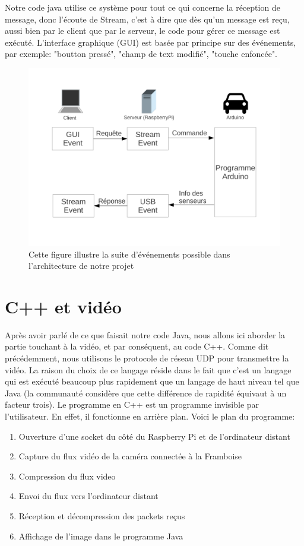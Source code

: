 \documentclass[a4paper,11pt]{report}
\begin{document}
{Notre code java utilise ce système pour tout ce qui concerne la réception de message, donc l'écoute de Stream, c'est à dire que dès qu'un message est reçu, aussi bien par le client que par le serveur, le code pour gérer ce message est exécuté. L'interface graphique (GUI) est basée par principe sur des événements, par exemple: "boutton pressé", "champ de text modifié", "touche enfoncée".

\begin{figure}[h]
\includegraphics[width=1.0\textwidth]{figures/EventProgramming2.pdf}
\caption[Evénements dans notr architecture]{\label{SuiteEvent}Cette figure illustre la suite d'événements possible dans l'architecture de notre projet}
\end{figure}
\section{C++ et vidéo}

Après avoir parlé de ce que faisait notre code Java, nous allons ici aborder la partie touchant à la vidéo, et par conséquent, au code C++.  Comme dit précédemment, nous utilisons le protocole de réseau UDP  pour transmettre la vidéo. La raison du choix de ce langage réside dans le fait que c'est un langage qui est exécuté beaucoup plus rapidement que un langage de haut niveau tel que Java (la communauté considère que cette différence de rapidité équivaut à un facteur trois). Le programme en C++ est un programme invisible par l'utilisateur. En effet, il fonctionne en arrière plan. Voici le plan du programme:
\begin{enumerate}
\item Ouverture d'une socket du côté du Raspberry Pi et de l'ordinateur distant
\item Capture du flux vidéo de la caméra connectée à la Framboise
\item Compression du flux video
\item Envoi du flux vers l'ordinateur distant
\item Réception et décompression des packets reçus
\item Affichage de l'image dans le programme Java
\end{enumerate}



}
\end{document}
